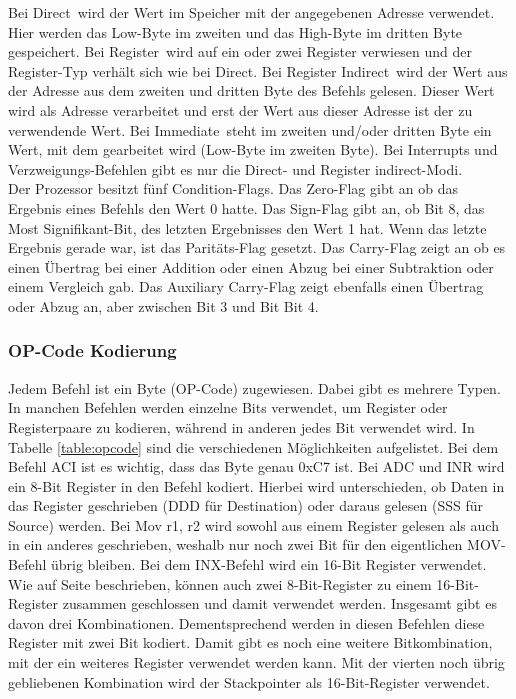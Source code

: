 \documentclass[12pt]{article}
\begin{document}
\noindent
Bei \glqq Direct\grqq\ wird der Wert im Speicher mit der angegebenen Adresse verwendet. Hier werden das Low-Byte im zweiten und das High-Byte im dritten Byte gespeichert. Bei \glqq Register\grqq\ wird auf ein oder zwei Register verwiesen und der Register-Typ verhält sich wie bei \glqq Direct\grqq. Bei \glqq Register Indirect\grqq\ wird der Wert aus der Adresse aus dem zweiten und dritten Byte des Befehls gelesen. Dieser Wert wird als Adresse verarbeitet und erst der Wert aus dieser Adresse ist der zu verwendende Wert. Bei \glqq Immediate\grqq\ steht
im zweiten und/oder dritten Byte ein Wert, mit dem gearbeitet wird (Low-Byte im zweiten Byte).
Bei Interrupts und Verzweigungs-Befehlen gibt es nur die \glqq Direct\grqq - und \glqq Register indirect\grqq -Modi. \cite{IntMan45}
\\ 

\noindent
Der Prozessor besitzt fünf Condition-Flags. Das Zero-Flag gibt an ob das Ergebnis eines Befehls den Wert 0 hatte. Das Sign-Flag gibt an, ob Bit 8, das Most Signifikant-Bit, des letzten Ergebnisses den Wert 1 hat. Wenn das letzte Ergebnis gerade war, ist das Paritäts-Flag gesetzt. Das Carry-Flag zeigt an ob es einen Übertrag bei einer Addition oder einen Abzug bei einer Subtraktion oder einem Vergleich gab. Das Auxiliary Carry-Flag zeigt ebenfalls einen Übertrag oder Abzug an, aber zwischen Bit 3 und Bit Bit 4. \cite{IntMan45}
\\

\subsubsection{OP-Code Kodierung}
\label{chapter:opcode}
Jedem Befehl ist ein Byte (OP-Code) zugewiesen. Dabei gibt es mehrere Typen. In manchen Befehlen werden einzelne Bits verwendet, um Register oder Registerpaare zu kodieren, während in anderen jedes Bit verwendet wird. In Tabelle \ref{table:opcode} sind die verschiedenen Möglichkeiten aufgelistet. Bei dem Befehl ACI ist es wichtig, dass das Byte genau 0xC7 ist. Bei ADC und INR wird ein 8-Bit Register in den Befehl kodiert. Hierbei wird unterschieden, ob Daten in das Register geschrieben (DDD für Destination) oder daraus gelesen (SSS für Source) werden. Bei Mov r1, r2 wird sowohl aus einem Register gelesen als auch in ein anderes geschrieben, weshalb nur noch zwei Bit für den eigentlichen MOV-Befehl übrig bleiben. Bei dem INX-Befehl wird ein 16-Bit Register verwendet. Wie auf Seite \pageref{RegisterSection} beschrieben, können auch zwei 8-Bit-Register zu einem 16-Bit-Register zusammen geschlossen und damit verwendet werden. Insgesamt gibt es davon drei Kombinationen. Dementsprechend werden in diesen Befehlen diese Register mit zwei Bit kodiert. Damit gibt es noch eine weitere Bitkombination, mit der ein weiteres Register verwendet werden kann. Mit der vierten noch übrig gebliebenen Kombination wird der Stackpointer als 16-Bit-Register verwendet.
\end{document}
